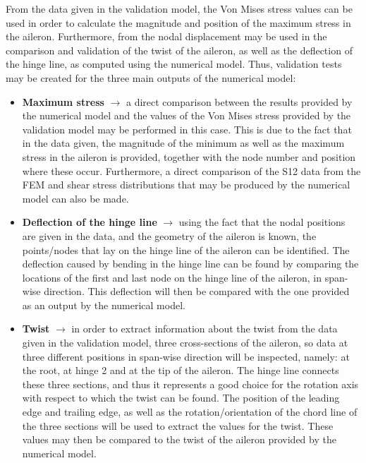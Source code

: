 From the data given in the validation model, the Von Mises stress values can be used in order to calculate the magnitude and position of the maximum stress in the aileron. Furthermore, from the nodal displacement may be used in the comparison and validation of the twist of the aileron, as well as the deflection of the hinge line, as computed using the numerical model. Thus, validation tests may be created for the three main outputs of the numerical model: 
\begin{itemize}
    \item \textbf{Maximum stress} $\rightarrow$ a direct comparison between the results provided by the numerical model and the values of the Von Mises stress provided by the validation model may be performed in this case. This is due to the fact that in the data given, the magnitude of the minimum as well as the maximum stress in the aileron is provided, together with the node number and position where these occur. Furthermore, a direct comparison of the S12 data from the FEM and shear stress distributions that may be produced by the numerical model can also be made. 
    
    \item \textbf{Deflection of the hinge line} $\rightarrow$ using the fact that the nodal positions are given in the data, and the geometry of the aileron is known, the points/nodes that lay on the hinge line of the aileron can be identified. The deflection caused by bending in the hinge line can be found by comparing the locations of the first and last node on the hinge line of the aileron, in span-wise direction. This deflection will then be compared with the one provided as an output by the numerical model.
    
    \item \textbf{Twist} $\rightarrow$ in order to extract information about the twist from the data given in the validation model, three cross-sections of the aileron, so data at three different positions in span-wise direction will be inspected, namely: at the root, at hinge 2 and at the tip of the aileron. The hinge line connects these three sections, and thus it represents a good choice for the rotation axis with respect to which the twist can be found. The position of the leading edge and trailing edge, as well as the rotation/orientation of the chord line of the three sections will be used to extract the values for the twist. These values may then be compared to the twist of the aileron provided by the numerical model.  
    
\end{itemize}


